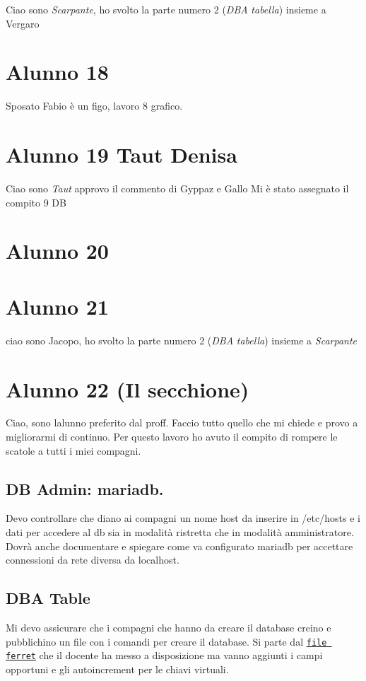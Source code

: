Ciao sono {\itshape Scarpante}, ho svolto la parte numero 2 ({\itshape D\+BA} {\itshape tabella}) insieme a Vergaro \section*{Alunno 18}

Sposato Fabio è un figo, lavoro 8 grafico. \section*{Alunno 19 Taut Denisa}

Ciao sono {\itshape Taut} approvo il commento di Gyppaz e Gallo Mi è stato assegnato il compito 9 DB \section*{Alunno 20}

\section*{Alunno 21}

ciao sono Jacopo, ho svolto la parte numero 2 ({\itshape D\+BA} {\itshape tabella}) insieme a {\itshape Scarpante}

\section*{Alunno 22 (Il secchione)}

Ciao, sono l\textquotesingle{}alunno preferito dal proff. Faccio tutto quello che mi chiede e provo a migliorarmi di continuo. Per questo lavoro ho avuto il compito di rompere le scatole a tutti i miei compagni.

\subsection*{DB Admin\+: mariadb.}

Devo controllare che diano ai compagni un nome host da inserire in /etc/hosts e i dati per accedere al db sia in modalità ristretta che in modalità amministratore. Dovrà anche documentare e spiegare come va configurato mariadb per accettare connessioni da rete diversa da localhost.

\subsection*{D\+BA Table}

Mi devo assicurare che i compagni che hanno da creare il database creino e pubblichino un file con i comandi per creare il database. Si parte dal \href{./manuali/documenti.ger}{\tt file ferret} che il docente ha messo a disposizione ma vanno aggiunti i campi opportuni e gli autoincrement per le chiavi virtuali.

